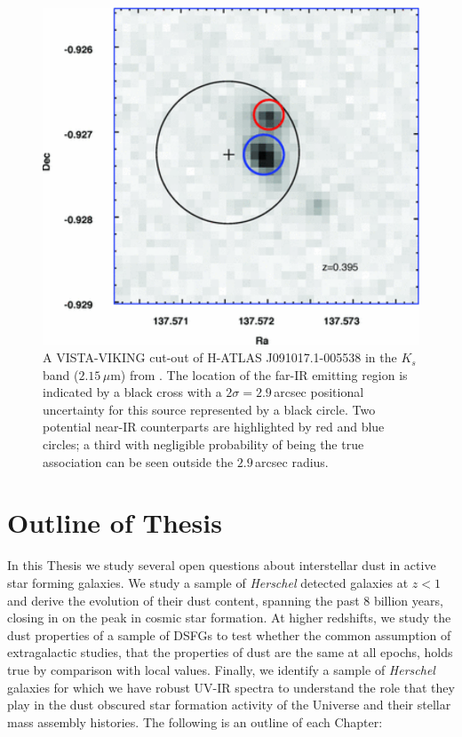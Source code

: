 \begin{figure}
    \centering
	\includegraphics[width=0.68\columnwidth]{Figures/viking_cutout.pdf}
	\caption[VISTA-VIKING cut-out of H-ATLAS J091017.1-005538]{A VISTA-VIKING cut-out of H-ATLAS J091017.1-005538 in the $K_s$ band ($2.15\,\mu$m) from \citealt{Fleuren_2012}. The location of the far-IR emitting region is indicated by a black cross with a $2\sigma = 2.9\,$arcsec positional uncertainty for this source represented by a black circle. Two potential near-IR counterparts are highlighted by red and blue circles; a third with negligible probability of being the true association can be seen outside the $2.9\,$arcsec radius.}
	\label{fig:viking_cutout}
\end{figure}

\section{Outline of Thesis}

In this Thesis we study several open questions about interstellar dust in active star forming galaxies. We study a sample of \textit{Herschel} detected galaxies at $z < 1$ and derive the evolution of their dust content, spanning the past $8$ billion years, closing in on the peak in cosmic star formation. At higher redshifts, we study the dust properties of a sample of DSFGs to test whether the common assumption of extragalactic studies, that the properties of dust are the same at all epochs, holds true by comparison with local values. Finally, we identify a sample of \textit{Herschel} galaxies for which we have robust UV-IR spectra to understand the role that they play in the dust obscured star formation activity of the Universe and their stellar mass assembly histories. The following is an outline of each Chapter:

